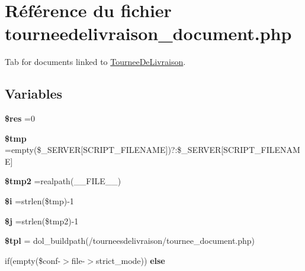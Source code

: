 \hypertarget{tourneedelivraison__document_8php}{}\section{Référence du fichier tourneedelivraison\+\_\+document.\+php}
\label{tourneedelivraison__document_8php}


Tab for documents linked to \hyperlink{classTourneeDeLivraison}{Tournee\+De\+Livraison}.  


\subsection*{Variables}
\begin{DoxyCompactItemize}
\item 
\mbox{\label{tourneedelivraison__document_8php_a49a8a4009b02e49717caa88b128affc5}} 
{\bfseries \$res} =0
\item 
\mbox{\label{tourneedelivraison__document_8php_a57024d47cf8348153f5fdda16f8fefa9}} 
{\bfseries \$tmp} =empty(\$\+\_\+\+S\+E\+R\+V\+ER\mbox{[}\textquotesingle{}S\+C\+R\+I\+P\+T\+\_\+\+F\+I\+L\+E\+N\+A\+ME\textquotesingle{}\mbox{]})?\textquotesingle{}\textquotesingle{}\+:\$\+\_\+\+S\+E\+R\+V\+ER\mbox{[}\textquotesingle{}S\+C\+R\+I\+P\+T\+\_\+\+F\+I\+L\+E\+N\+A\+ME\textquotesingle{}\mbox{]}
\item 
\mbox{\label{tourneedelivraison__document_8php_aed9bcb6730d1510376ce80e32bd9504d}} 
{\bfseries \$tmp2} =realpath(\+\_\+\+\_\+\+F\+I\+L\+E\+\_\+\+\_\+)
\item 
\mbox{\label{tourneedelivraison__document_8php_a83018d9153d17d91fbcf3bc10158d34f}} 
{\bfseries \$i} =strlen(\$tmp)-\/1
\item 
\mbox{\label{tourneedelivraison__document_8php_a6f16db779ef3ccea921b277b5dc245d1}} 
{\bfseries \$j} =strlen(\$tmp2)-\/1
\item 
\mbox{\label{tourneedelivraison__document_8php_a04b1944cdb09f9a4e290cde7a12499e6}} 
{\bfseries \$tpl} = dol\+\_\+buildpath(\textquotesingle{}/tourneesdelivraison/tournee\+\_\+document.\+php\textquotesingle{})
\item 
if(empty(\$conf-\/$>$file-\/$>$strict\+\_\+mode)) {\bfseries else}
\end{DoxyCompactItemize}



